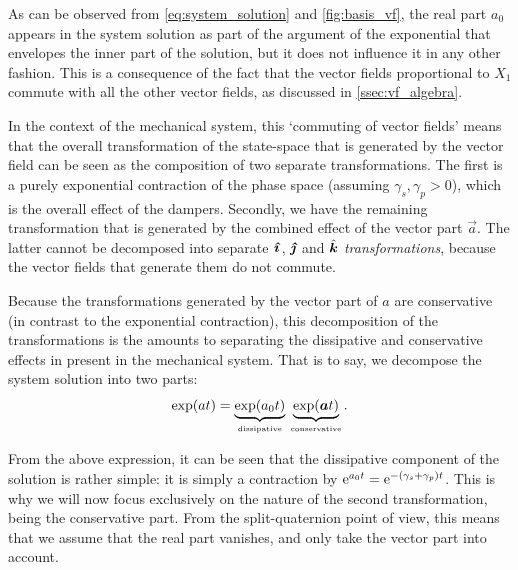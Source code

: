 As can be observed from \cref{eq:system_solution} and \cref{fig:basis_vf}, the real part $a_0$ appears in the system solution as part of the argument of the exponential that envelopes the inner part of the solution, but it does not influence it in any other fashion. This is a consequence of the fact that the vector fields proportional to $X_1$ commute with all the other vector fields, as discussed in \cref{ssec:vf_algebra}. 

In the context of the mechanical system, this `commuting of vector fields' means that the overall transformation of the state-space that is generated by the vector field can be seen as the composition of two separate transformations. The first is a purely exponential contraction of the phase space (assuming $\gamma_s, \gamma_p > 0$), which is the overall effect of the dampers. Secondly, we have the remaining transformation that is generated by the combined effect of the vector part $\vec{a}$. The latter cannot be decomposed into separate $\quati$, $\quatj$ and $\quatk$ \emph{transformations}, because the vector fields that generate them do not commute.

Because the transformations generated by the vector part of $a$ are conservative (in contrast to the exponential contraction), this decomposition of the transformations is the amounts to separating the dissipative and conservative effects in present in the mechanical system. That is to say, we decompose the system solution into two parts:
$$ \exp(a t) = \underbrace{\exp(a_0 t)}_{\text{\tiny dissipative}} \: \underbrace{\exp(\vec{a} t)}_{\text{\tiny conservative}}. $$

From the above expression, it can be seen that the dissipative component of the solution is rather simple: it is simply a contraction by $\ec^{a_0t } = \ec^{-(\gamma_s + \gamma_p)t}$. This is why we will now focus exclusively on the nature of the second transformation, being the conservative part. From the split-quaternion point of view, this means that we assume that the real part vanishes, and only take the vector part into account.

